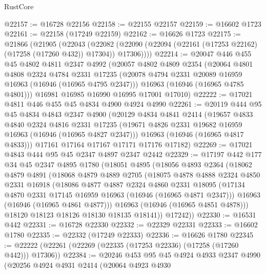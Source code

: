 \begin{lexlean}{RustCore}
\begin{coremodule}
@22157 := @16728 @22156
@22158 := @22155 @22157
@22159 := @16602 @1723
@22161 := @22158 (@17249 @22159)
@22162 := @16626 @1723
@22175 := @21866
    (@21905
      (@22043
        (@22082 (@22090 (@22094 (@22161 (@17253 @22162) (@17258 (@17260 @432)) @17304)) @17306))))
@22214 := @20047
    @446
    @455
    @45
    @4802
    @4811
    @2347
    @4992
    (@20057
      @4802
      @4809
      @2354
      (@20064
        @4801
        @4808
        @2324
        @4784
        @2331
        @17235
        (@20078 @4794 @2331 @20089 @16959 @16963 (@16946 (@16965 @4795 @2347)))
        @16963
        (@16946 (@16965 @4785 @4801)))
      @16981
      @16985
      @16990
      @16995
      @17001
      @17010)
@22222 := @17021 @4811 @446 @455 @45 @4834 @4900 @4924 @4990
@22261 := @20119
    @444
    @95
    @45
    @4834
    @4843
    @2347
    @4900
    (@20129
      @4834
      @4841
      @2414
      (@19657
        @4833
        @4840
        @2324
        @4816
        @2331
        @17235
        (@19671 @4826 @2331 @19682 @16959 @16963 (@16946 (@16965 @4827 @2347)))
        @16963
        (@16946 (@16965 @4817 @4833)))
      @17161
      @17164
      @17167
      @17171
      @17176
      @17182)
@22269 := @17021 @4843 @444 @95 @45 @2347 @4897 @2347 @2442
@22329 := @17197
    @442
    @177
    @34
    @45
    @2347
    @4895
    @1780
    (@18051
      @4895
      (@18056
        @4893
        @2364
        (@18062
          @4879
          @4891
          (@18068
            @4879
            @4889
            @2705
            (@18075
              @4878
              @4888
              @2324
              @4850
              @2331
              @16918
              (@18086
                @4877
                @4887
                @2324
                @4860
                @2331
                @18095
                (@17134 @4870 @2331 @17145 @16959 @16963 (@16946 (@16965 @4871 @2347)))
                @16963
                (@16946 (@16965 @4861 @4877)))
              @16963
              (@16946 (@16965 @4851 @4878)))
            @18120
            @18123
            @18126
            @18130
            @18135
            @18141))
        @17242))
@22330 := @16531 @442
@22331 := @16728 @22330
@22332 := @22329 @22331
@22333 := @16602 @1780
@22335 := @22332 (@17249 @22333)
@22336 := @16626 @1780
@22345 := @22222 (@22261 (@22269 (@22335 (@17253 @22336) (@17258 (@17260 @442))) @17306))
@22384 := @20246
    @453
    @95
    @45
    @4924
    @4933
    @2347
    @4990
    (@20256
      @4924
      @4931
      @2414
      (@20064
        @4923
        @4930

\end{coremodule}
\end{lexlean}
